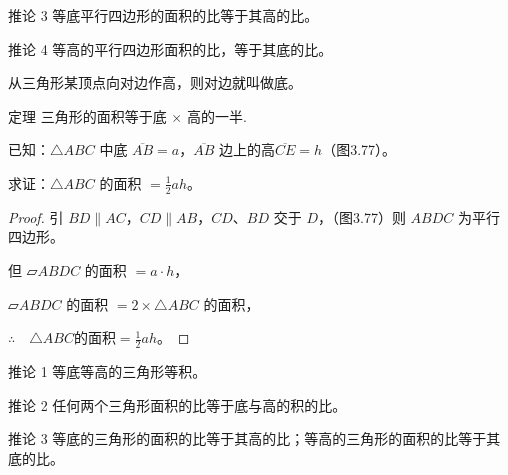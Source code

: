 \begin{Deduction}{推论 3}
等底平行四边形的面积的比等于其高的比。
\end{Deduction}

\begin{Deduction}{推论 4} 
等高的平行四边形面积的比，等于其底的比。
\end{Deduction}

从三角形某顶点向对边作高，则对边就叫做底。

\begin{Theorem}{定理} 
三角形的面积等于底 $\times$ 高的一半.
\end{Theorem}

已知：$\triangle ABC$ 中底 $\overline{AB}=a$，$\overline{AB}$ 边上的高$\overline{CE}=h$（图3.77）。

求证：$\triangle ABC$ 的面积 $=\frac{1}{2}ah$。

\begin{figure}
\begin{tikzpicture}
\end{tikzpicture}
    \caption{}
\end{figure}

\begin{proof}
引 $BD\parallel AC$，$CD\parallel AB$，$CD$、$BD$ 交于 $D$，（图3.77）则 $ABDC$ 为平行四边形。

但 $\parallelogram ABDC$ 的面积 $=a\cdot h$，

$\parallelogram ABDC$ 的面积 $=2\times\triangle ABC$ 的面积，

$\therefore\quad \triangle ABC$的面积$=\frac{1}{2}ah$。
\end{proof}

\begin{Deduction}{推论 1}
等底等高的三角形等积。
\end{Deduction}

\begin{Deduction}{推论 2}
任何两个三角形面积的比等于底与高的积的比。
\end{Deduction}


\begin{Deduction}{推论 3} 
等底的三角形的面积的比等于其高的比；等高的三角形的面积的比等于其底的比。
\end{Deduction}

